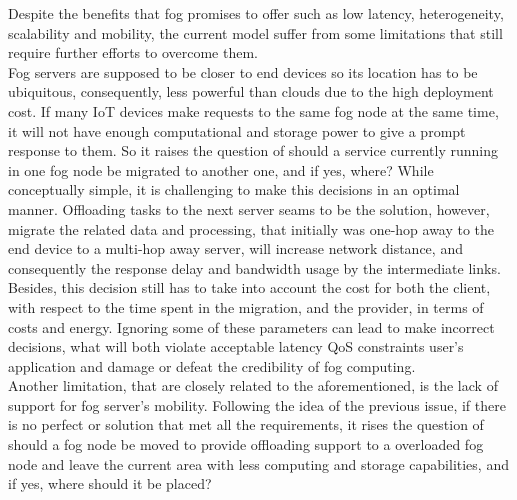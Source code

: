 \noindent\tab Despite the benefits that fog promises to offer such as low latency, heterogeneity, scalability and mobility, the current model suffer from some limitations that still require further efforts to overcome them.\\
\noindent\tab Fog servers are supposed to be closer to end devices so its location has to be ubiquitous, consequently, less powerful than clouds due to the high deployment cost. If many IoT devices make requests to the same fog node at the same time, it will not have enough computational and storage power to give a prompt response to them. So it raises the question of should a service currently running in one fog node be migrated to another one, and if yes, where? While conceptually simple, it is challenging to make this decisions in an optimal manner. Offloading tasks to the next server seams to be the solution, however, migrate the related data and processing, that initially was one-hop away to the end device to a multi-hop away server, will increase network distance, and consequently the response delay and bandwidth usage by the intermediate links. Besides, this decision still has to take into account the cost for both the client, with respect to the time spent in the migration, and the provider, in terms of costs and energy. Ignoring some of these parameters can lead to make incorrect decisions, what will both violate acceptable latency QoS constraints user's application and damage or defeat the credibility of fog computing.\\
\noindent\tab Another limitation, that are closely related to the aforementioned, is the lack of support for fog server's mobility. Following the idea of the previous issue, if there is no perfect or solution that met all the requirements, it rises the question of should a fog node be moved to provide offloading support to a overloaded fog node and leave the current area with less computing and storage capabilities, and if yes, where should it be placed?\\
